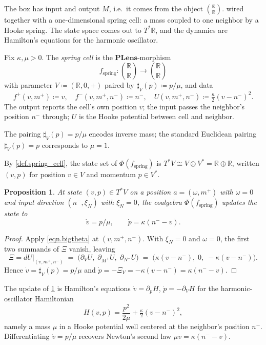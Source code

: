 \documentclass[11pt, oneside, article]{memoir}
\theoremstyle{definition}
\theoremstyle{plain}
\newtheorem{proposition}[proposition]{Proposition}
\newenvironment{remark}
  {\pushQED{\qed}\renewcommand{\qedsymbol}{$\lozenge$}\remarkx}
  {\popQED\endremarkx}
\newenvironment{definition}
  {\pushQED{\qed}\renewcommand{\qedsymbol}{$\lozenge$}\definitionx}
  {\popQED\enddefinitionx}
\newcommand{\Cat}[1]{\mathbf{#1}}%
\newcommand{\rr}{\mathbb{R}}
\newcommand{\potlens}{\Cat{PLens}}
\newcommand{\inpt}[1]{#1^{-}}
\newcommand{\outp}[1]{#1^{+}}
\begin{document}
The box has input and output $M$, i.e.\ it comes from the object $\binom{\rr}{\rr}$. 
wired together  with a one-dimensional spring cell: a mass coupled to one neighbor by a Hooke spring. The state space comes out to $T^*\rr$, and the dynamics are Hamilton's equations for the harmonic oscillator.

\begin{definition}\label{def.spring_cell}
Fix $\kappa,\mu>0$. The \emph{spring cell} is the $\potlens$-morphism
\[
f_\mathrm{spring}\colon\binom{\rr}{\rr}\to\binom{\rr}{\rr}
\]
with parameter $V\coloneqq(\rr,0,+)$ paired by $\sharp_V(p)\coloneqq p/\mu$, and data
\[
\outp f(v,\outp m)\coloneqq v,
\quad
\inpt f(v,\outp m,\inpt n)\coloneqq\inpt n,
\quad
U(v,\outp m,\inpt n)\coloneqq\tfrac{\kappa}{2}(v-\inpt n)^2.
\]
The output reports the cell's own position $v$; the input passes the neighbor's position $\inpt n$ through; $U$ is the Hooke potential between cell and neighbor.
\end{definition}

\begin{remark}\label{rmk.spring_pairing}
The pairing $\sharp_V(p)=p/\mu$ encodes inverse mass; the standard Euclidean pairing $\sharp_V(p)=p$ corresponds to $\mu=1$.
\end{remark}

By \cref{def.spring_cell}, the state set of $\Phi(f_\mathrm{spring})$ is $T^*V\cong V\oplus V^*=\rr\oplus\rr$, written $(v,p)$ for position $v\in V$ and momentum $p\in V^*$.

\begin{proposition}\label{prop.spring_dynamics}
At state $(v,p)\in T^*V$ on a position $a=(\omega,\outp m)$ with $\omega=0$ and input direction $(\inpt n,\xi_N)$ with $\xi_N=0$, the coalgebra $\Phi(f_\mathrm{spring})$ updates the state to
\[
\dot v = p/\mu,
\qquad
\dot p = \kappa(\inpt n-v).
\]
\end{proposition}

\begin{proof}
Apply \eqref{eqn.bigtheta} at $(v,\outp m,\inpt n)$. With $\xi_N=0$ and $\omega=0$, the first two summands of $\Xi$ vanish, leaving
\[
\Xi=dU\big|_{(v,\outp m,\inpt n)}
\;=\;\bigl(\partial_V U,\;\partial_{\outp M}U,\;\partial_{\inpt N}U\bigr)
\;=\;\bigl(\kappa(v-\inpt n),\;0,\;-\kappa(v-\inpt n)\bigr).
\]
Hence $\dot v=\sharp_V(p)=p/\mu$ and $\dot p=-\Xi_V=-\kappa(v-\inpt n)=\kappa(\inpt n-v)$.\qedhere
\end{proof}

\begin{remark}[Harmonic oscillator]\label{rmk.spring_hamiltonian}
The update of \cref{prop.spring_dynamics} is Hamilton's equations $\dot v=\partial_p H$, $\dot p=-\partial_V H$ for the harmonic-oscillator Hamiltonian
\[
H(v,p)=\frac{p^2}{2\mu}+\tfrac{\kappa}{2}(v-\inpt n)^2,
\]
namely a mass $\mu$ in a Hooke potential well centered at the neighbor's position $\inpt n$. Differentiating $\dot v=p/\mu$ recovers Newton's second law $\mu\ddot v=\kappa(\inpt n-v)$.
\end{remark}
\end{document}
